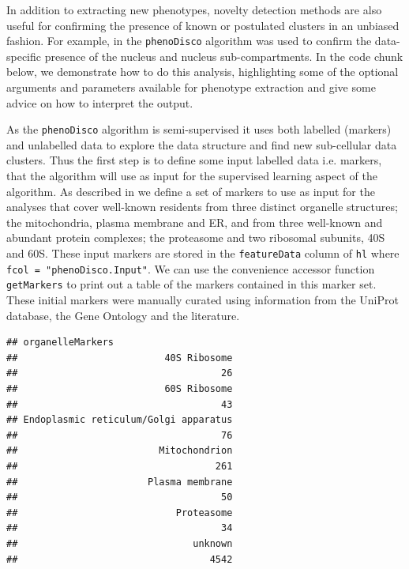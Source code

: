 In addition to extracting new phenotypes, novelty detection methods
are also useful for confirming the presence of known or postulated
clusters in an unbiased fashion. For example, in \cite{hyper} the
\texttt{phenoDisco} algorithm was used to confirm the data-specific presence
of the nucleus and nucleus sub-compartments. In the code chunk below,
we demonstrate how to do this analysis, highlighting some of the
optional arguments and parameters available for phenotype extraction
and give some advice on how to interpret the output.

As the \texttt{phenoDisco} algorithm is semi-supervised it uses both labelled
(markers) and unlabelled data to explore the data structure and find
new sub-cellular data clusters. Thus the first step is to define some
input labelled data i.e. markers, that the algorithm will use as input
for the supervised learning aspect of the algorithm. As described in
\cite{hyper} we define a set of markers to use as input for the analyses
that cover well-known residents from three distinct organelle
structures; the mitochondria, plasma membrane and ER, and from three
well-known and abundant protein complexes; the proteasome and two
ribosomal subunits, 40S and 60S.  These input markers are stored in
the \texttt{featureData} column of \texttt{hl} where \texttt{fcol = "phenoDisco.Input"}. We
can use the convenience accessor function \texttt{getMarkers} to print out a
table of the markers contained in this marker set. These initial
markers were manually curated using information from the UniProt
database, the Gene Ontology and the literature.

\begin{knitrout}
\color{fgcolor}\begin{kframe}
\begin{alltt}
  \hlstd{=} \hlstd{)}
\end{alltt}
\begin{verbatim}
## organelleMarkers
##                          40S Ribosome 
##                                    26 
##                          60S Ribosome 
##                                    43 
## Endoplasmic reticulum/Golgi apparatus 
##                                    76 
##                         Mitochondrion 
##                                   261 
##                       Plasma membrane 
##                                    50 
##                            Proteasome 
##                                    34 
##                               unknown 
##                                  4542
\end{verbatim}
\end{kframe}
\end{knitrout}

